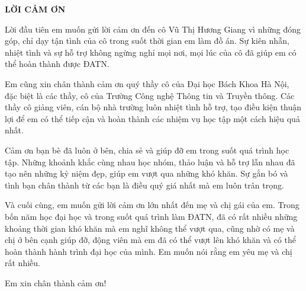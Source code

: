 \documentclass[../DoAn.tex]{subfiles}
\begin{document}
\begin{center}
    \Large{\textbf{LỜI CẢM ƠN}}\\
\end{center}
\vspace{1cm}
Lời đầu tiên em muốn gửi lời cảm ơn đến cô Vũ Thị Hương Giang vì những đóng góp, chỉ dạy tận tình của cô trong suốt thời gian em làm đồ án. Sự kiên nhẫn, nhiệt tình và
sự hỗ trợ không ngừng nghỉ mọi nơi, mọi lúc của cô đã giúp em có thể hoàn thành được ĐATN.

Em cũng xin chân thành cảm ơn quý thầy cô của Đại học Bách Khoa Hà Nội, đặc
biệt là các thầy, cô của Trường Công nghệ Thông tin và Truyền thông. Các thầy cô
giảng viên, cán bộ nhà trường luôn nhiệt tình hỗ trợ, tạo điều kiện thuận lợi để em
có thể tiếp cận và hoàn thành các nhiệm vụ học tập một cách hiệu quả nhất.

Cảm ơn bạn bè đã luôn ở bên, chia sẻ và giúp đỡ em trong suốt quá trình học
tập. Những khoảnh khắc cùng nhau học nhóm, thảo luận và hỗ trợ lẫn nhau đã tạo
nên những kỷ niệm đẹp, giúp em vượt qua những khó khăn. Sự gắn bó và tình bạn
chân thành từ các bạn là điều quý giá nhất mà em luôn trân trọng. 

Và cuối cùng, em muốn gửi lời cảm ơn lớn nhất đến mẹ và chị gái của em. Trong bốn năm học đại học và trong suốt quá trình làm ĐATN, đã có rất nhiều những khoảng thời gian khó khăn mà em nghĩ không thể vượt qua, cũng nhờ có mẹ và chị ở bên cạnh giúp đỡ, động viên mà em đã có thể vượt lên khó khăn và có thể hoàn thành hành trình đại học của mình. Em muốn nói rằng em yêu mẹ và chị rất nhiều. 

Em xin chân thành cảm ơn!
\end{document}
